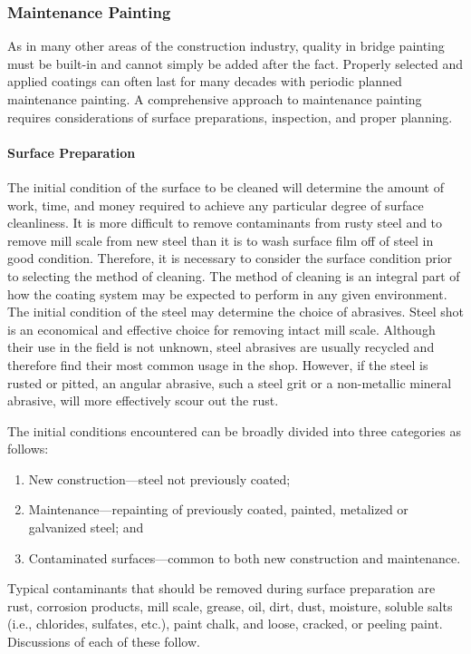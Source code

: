 \subsubsection{Maintenance Painting}
As in many other areas of the construction industry, quality in bridge painting must be built-in and cannot simply
be added after the fact. Properly selected and applied coatings can often last for many decades with periodic planned
maintenance painting. A comprehensive approach to maintenance painting requires considerations of surface
preparations, inspection, and proper planning.

\paragraph{Surface Preparation}
The initial condition of the surface to be cleaned will determine the amount of work, time, and money required to
achieve any particular degree of surface cleanliness. It is more difficult to remove contaminants from rusty steel and
to remove mill scale from new steel than it is to wash surface film off of steel in good condition. Therefore, it is
necessary to consider the surface condition prior to selecting the method of cleaning. The method of cleaning is an
integral part of how the coating system may be expected to perform in any given environment. The initial condition
of the steel may determine the choice of abrasives. Steel shot is an economical and effective choice for removing
intact mill scale. Although their use in the field is not unknown, steel abrasives are usually recycled and therefore
find their most common usage in the shop. However, if the steel is rusted or pitted, an angular abrasive, such a steel
grit or a non-metallic mineral abrasive, will more effectively scour out the rust.

The initial conditions encountered can be broadly divided into three categories as follows:
\begin{enumerate}
  \item New construction—steel not previously coated;
  \item Maintenance—repainting of previously coated, painted, metalized or galvanized steel; and
  \item Contaminated surfaces—common to both new construction and maintenance.
\end{enumerate}

Typical contaminants that should be removed during surface preparation are rust, corrosion products, mill scale,
grease, oil, dirt, dust, moisture, soluble salts (i.e., chlorides, sulfates, etc.), paint chalk, and loose, cracked, or peeling
paint. Discussions of each of these follow.

